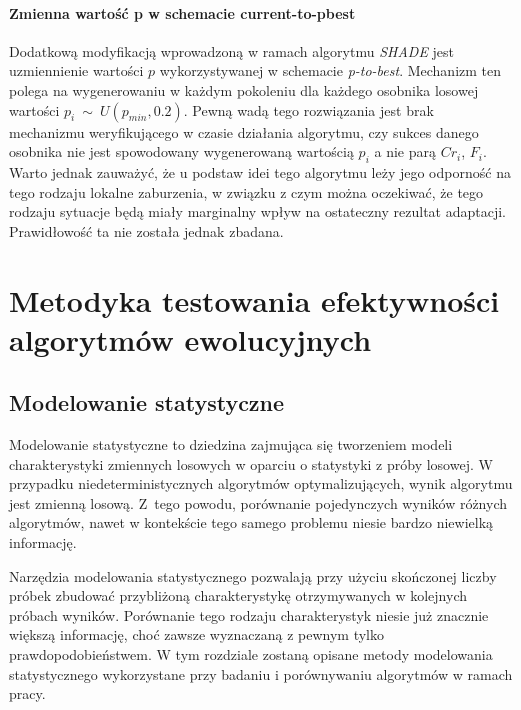 \documentclass[12pt,a4paper]{report}
\begin{document}
{{{\begin{description}
\subsubsection{Zmienna wartość p w schemacie current-to-pbest}
\par{
Dodatkową modyfikacją wprowadzoną w ramach algorytmu \emph{SHADE} jest uzmiennienie wartości $p$ wykorzystywanej w schemacie \emph{p-to-best}. Mechanizm ten polega na wygenerowaniu w każdym pokoleniu dla każdego osobnika losowej wartości $p_i~\sim~U(p_{min}, 0.2)$. Pewną wadą tego rozwiązania jest brak mechanizmu weryfikującego w czasie działania algorytmu, czy sukces danego osobnika nie jest spowodowany wygenerowaną wartością $p_i$ a nie parą $Cr_i$, $F_i$. Warto jednak zauważyć, że u podstaw idei tego algorytmu leży jego odporność na tego rodzaju lokalne zaburzenia, w związku z czym można oczekiwać, że tego rodzaju sytuacje będą miały marginalny wpływ na ostateczny rezultat adaptacji. Prawidłowość ta nie została jednak zbadana.
}
\end{description}

\chapter{Metodyka testowania efektywności algorytmów ewolucyjnych}
\section{Modelowanie statystyczne}
\par{
Modelowanie statystyczne to dziedzina zajmująca się tworzeniem modeli charakterystyki zmiennych losowych w oparciu o statystyki z próby losowej. W przypadku niedeterministycznych algorytmów optymalizujących, wynik algorytmu jest zmienną losową. Z~tego powodu, porównanie pojedynczych wyników różnych algorytmów, nawet w kontekście tego samego problemu niesie bardzo niewielką informację.
}
\par{
Narzędzia modelowania statystycznego pozwalają przy użyciu skończonej liczby próbek zbudować przybliżoną charakterystykę otrzymywanych w kolejnych próbach wyników. Porównanie tego rodzaju charakterystyk niesie już znacznie większą informację, choć zawsze wyznaczaną z pewnym tylko prawdopodobieństwem. W tym rozdziale zostaną opisane metody modelowania statystycznego wykorzystane przy badaniu i porównywaniu algorytmów w ramach pracy.
}
}}}
\end{document}
